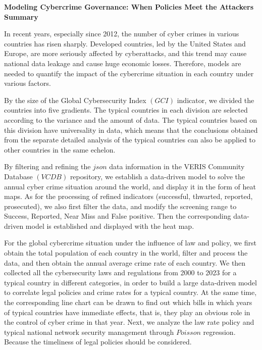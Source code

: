 \documentclass[12pt]{article}
\begin{document}
\begin{center}
	\fontsize{16}{19}\selectfont \textbf{Modeling Cybercrime Governance: When Policies Meet the Attackers} \\
	\bigskip
	\fontsize{16}{19}\selectfont \textbf{Summary} \\
\end{center}
\begin{adjustwidth}{2em}{2em}
	\hspace*{1.5em} In recent years, especially since 2012, the number of cyber crimes in various countries has risen sharply.
	Developed countries, led by the United States and Europe, are more seriously affected by cyberattacks,
	and this trend may cause national data leakage and cause huge economic losses.
	Therefore, models are needed to quantify the impact of the cybercrime situation in each country under various factors.

	By the size of the Global Cybersecurity Index $(GCI)$ indicator, we divided the countries into five gradients.
	The typical countries in each division are selected according to the variance and the amount of data.
	The typical countries based on this division have universality in data,
	which means that the conclusions obtained from the separate detailed analysis of the typical countries can also be applied to other countries in the same echelon.

	By filtering and refining the $json$ data information in the VERIS Community Database $(VCDB)$ repository,
	we establish a data-driven model to solve the annual cyber crime situation around the world, and display it in the form of heat maps.
	As for the processing of refined indicators (successful, thwarted, reported, prosecuted),
	we also first filter the data, and modify the screening range to Success, Reported, Near Miss and False positive.
	Then the corresponding data-driven model is established and displayed with the heat map.

	For the global cybercrime situation under the influence of law and policy,
	we first obtain the total population of each country in the world, filter and process the data, and then obtain the annual average crime rate of each country.
	We then collected all the cybersecurity laws and regulations from 2000 to 2023 for a typical country in different categories,
	in order to build a large data-driven model to correlate legal policies and crime rates for a typical country.
	At the same time, the corresponding line chart can be drawn to find out which bills in which years of typical countries have immediate effects,
	that is, they play an obvious role in the control of cyber crime in that year.
	Next, we analyze the law rate policy and typical national network security management through $Poisson$ regression.
	Because the timeliness of legal policies should be considered.


\end{adjustwidth}
\end{document}
